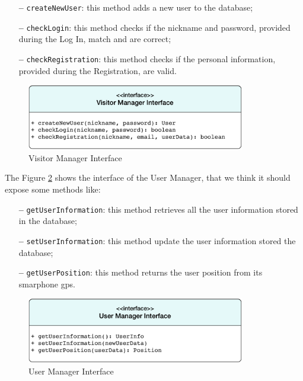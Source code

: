 \begin{itemize}
\item[\textbf{--}] \texttt{createNewUser}: this method adds a new user to the database;
\item[\textbf{--}] \texttt{checkLogin}: this method checks if the nickname and password, provided during the Log In, match and are correct;
\item[\textbf{--}] \texttt{checkRegistration}: this method checks if the personal information, provided during the Registration, are valid.
\end{itemize}

\begin{figure}[htbp]
\centering
\vspace{52pt}
\includegraphics[width=0.85\textwidth]{Images/VisitorManager.pdf}
\vspace{10pt}
\caption{Visitor Manager Interface}
\label{fig:visitor}
\end{figure}
\clearpage

\newline
The Figure \ref{fig:user} shows the interface of the User Manager, that we think it should expose some methods like:

\begin{itemize}
\item[\textbf{--}] \texttt{getUserInformation}: this method retrieves all the user information stored in the database;
\item[\textbf{--}] \texttt{setUserInformation}: this method update the user  information stored the database;
\item[\textbf{--}] \texttt{getUserPosition}: this method returns the user position from its smarphone \acs{gps}.
\end{itemize}

\begin{figure}[htbp]
\centering
\vspace{72pt}
\includegraphics[width=0.85\textwidth]{Images/UserManager.pdf}
\vspace{10pt}
\caption{User Manager Interface}
\label{fig:user}
\end{figure}
\clearpage

